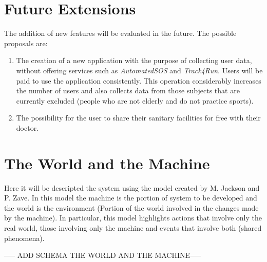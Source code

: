 \section{Future Extensions}
The addition of new features will be evaluated in the future. The possible proposals are:
\begin{enumerate}
  \item The creation of a new application with the purpose of collecting user data, without offering services such as \textit{AutomatedSOS} and \textit{Track4Run}. Users will be paid to use the application consistently. This operation considerably increases the number of users and also collects data from those subjects that are currently excluded (people who are not elderly and do not practice sports).
  \item The possibility for the user to share their sanitary facilities for free with their doctor.
\end{enumerate}

\section{The World and the Machine}
Here it will be descripted the system using the model created by M. Jackson and P. Zave.
In this model the machine is the portion of system to be developed and the world is the environment (Portion of the world involved in the changes made by the machine).
In particular, this model highlights actions that involve only the real world, those involving only the machine and events that involve both (shared phenomena).

\vspace{1cm}
----- ADD SCHEMA THE WORLD AND THE MACHINE-----
